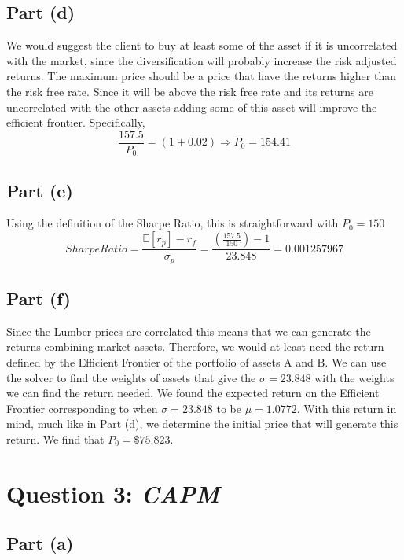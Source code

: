 \documentclass[12pt]{article}
\begin{document}
	\subsection{Part (d)}
	
		We would suggest the client to buy at least some of the asset if it is uncorrelated with the market, since the diversification will probably increase the risk adjusted returns.
		The maximum price should be a price that have the returns higher than the risk free rate. Since it will be above the risk free rate and its returns are uncorrelated with the other 					assets adding some of this asset will improve the efficient frontier. Specifically,
		$$ \frac{157.5}{P_{0}} = (1+ 0.02) \Rightarrow P_{0} = 154.41 $$
		
	\subsection{Part (e)}
		
		Using the definition of the Sharpe Ratio, this is straightforward with $P_{0} = 150$
		$$ Sharpe Ratio = \frac{\mathbb{E}[r_{p}] - r_{f}}{\sigma_{p}} = \frac{(\frac{157.5}{150}) - 1}{23.848} = 0.001257967  $$
	
	\subsection{Part (f)}
	
		Since the Lumber prices are correlated this means that we can generate the returns combining market assets. Therefore, we would at least need the return defined by 
		the Efficient Frontier of the portfolio of assets A and B. We can use the solver to find the weights of assets that give the $\sigma = 23.848$
		with the weights we can find the return needed. We found the expected return on the Efficient Frontier corresponding to when $\sigma = 23.848$ to be 
		$\mu = 1.0772$. With this return in mind, much like in Part (d), we determine the initial price that will generate this return. We find that $P_{0} = \$75.823$. 
		
		
\section{Question 3: \textit{CAPM}}

	\subsection{Part (a)}
		
\end{document}
